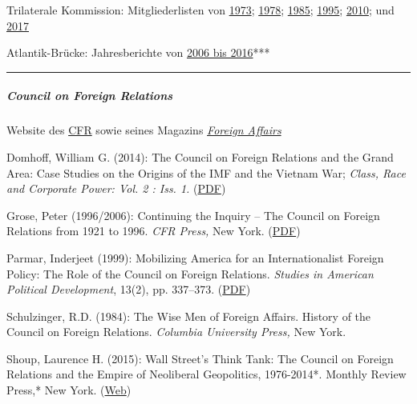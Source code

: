 Trilaterale Kommission: Mitgliederlisten von
\href{https://swprs.files.wordpress.com/2017/07/trilateral-commission-members-1973.pdf}{1973};
\href{https://swprs.files.wordpress.com/2017/07/trilateral-commission-members-1978.pdf}{1978};
\href{https://swprs.files.wordpress.com/2017/07/trilateral-commission-members-1985.pdf}{1985};
\href{https://swprs.files.wordpress.com/2017/07/trilateral-commission-members-1995.pdf}{1995};
\href{https://swprs.files.wordpress.com/2017/07/trilateral-commission-members-2010.pdf}{2010};
und
\href{https://swprs.files.wordpress.com/2017/07/trilateral-commission-members-2017.pdf}{2017}

Atlantik-Brücke: Jahresberichte von
\href{https://www.atlantik-bruecke.org/unsere-arbeit/publikationen/jahresberichte/}{2006
bis 2016}***

\begin{center}\rule{0.5\linewidth}{\linethickness}\end{center}

\hypertarget{council-on-foreign-relations}{%
\subparagraph{\texorpdfstring{\textbf{Council on Foreign
Relations}}{Council on Foreign Relations}}\label{council-on-foreign-relations}}

Website des \href{https://www.cfr.org/}{CFR} sowie seines Magazins
\href{https://www.foreignaffairs.com/}{\emph{Foreign Affairs}}

Domhoff, William G. (2014): The Council on Foreign Relations and the
Grand Area: Case Studies on the Origins of the IMF and the Vietnam War;
\emph{Class, Race and Corporate Power: Vol. 2 : Iss. 1.}
(\href{https://swprs.files.wordpress.com/2017/09/domhoff-cfr-2014.pdf}{PDF})

Grose, Peter (1996/2006): Continuing the Inquiry -- The Council on
Foreign Relations from 1921 to 1996. \emph{CFR Press,} New York.
(\href{https://www.cfr.org/book/continuing-inquiry}{PDF})

Parmar, Inderjeet (1999): Mobilizing America for an Internationalist
Foreign Policy: The Role of the Council on Foreign Relations.
\emph{Studies in American Political Development}, 13(2), pp. 337--373.
(\href{https://swprs.files.wordpress.com/2017/09/cfr-parmar-1999.pdf}{PDF})

Schulzinger, R.D. (1984): The Wise Men of Foreign Affairs. History of
the Council on Foreign Relations. \emph{Columbia University Press,} New
York.

Shoup, Laurence H. (2015): Wall Street's Think Tank: The Council on
Foreign Relations and the Empire of Neoliberal Geopolitics, 1976-2014*.
Monthly Review Press,* New York.
(\href{https://monthlyreview.org/product/wall-streets-think-tank/}{Web})

